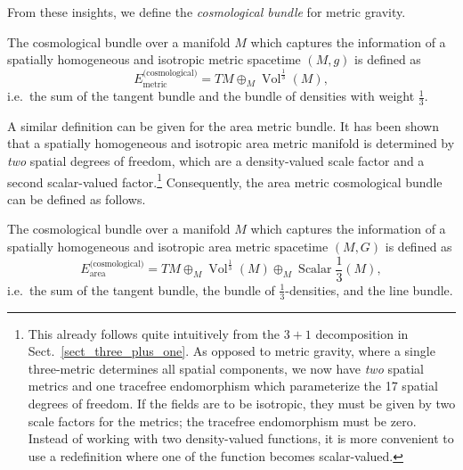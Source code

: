From these insights, we define the \emph{cosmological bundle} for metric gravity.
\begin{definition}
  The cosmological bundle over a manifold $M$ which captures the information of a spatially homogeneous and isotropic metric spacetime $(M,g)$ is defined as
  \begin{equation}
    E_\text{metric}^\text{(cosmological)} = TM \oplus_M \operatorname{Vol}^{\frac{1}{3}}(M),
  \end{equation}
  i.e.\ the sum of the tangent bundle and the bundle of densities with weight $\frac{1}{3}$.
\end{definition}
A similar definition can be given for the area metric bundle. It has been shown \cite{Duell_2020} that a spatially homogeneous and isotropic area metric manifold is determined by \emph{two} spatial degrees of freedom, which are a density-valued scale factor and a second scalar-valued factor.\footnote{This already follows quite intuitively from the $3+1$ decomposition in Sect.~\ref{sect_three_plus_one}. As opposed to metric gravity, where a single three-metric determines all spatial components, we now have \emph{two} spatial metrics and one tracefree endomorphism which parameterize the 17 spatial degrees of freedom. If the fields are to be isotropic, they must be given by two scale factors for the metrics; the tracefree endomorphism must be zero. Instead of working with two density-valued functions, it is more convenient to use a redefinition where one of the function becomes scalar-valued.} Consequently, the area metric cosmological bundle can be defined as follows.
\begin{definition}
  The cosmological bundle over a manifold $M$ which captures the information of a spatially homogeneous and isotropic area metric spacetime $(M,G)$ is defined as
  \begin{equation}
    E_\text{area}^\text{(cosmological)} = TM \oplus_M \operatorname{Vol}^{\frac{1}{3}}(M) \oplus_M \operatorname{Scalar}{\frac{1}{3}}(M),
  \end{equation}
  i.e.\ the sum of the tangent bundle, the bundle of $\frac{1}{3}$-densities, and the line bundle.
\end{definition}

